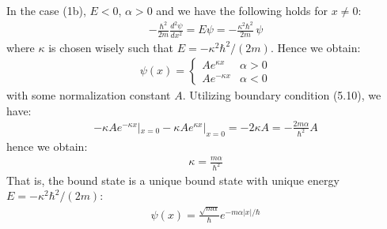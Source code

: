 \documentclass[11pt]{book}
\theoremstyle{break}
\theoremstyle{break}
\begin{document}
In the case (1b), $E<0$, $\alpha>0$ and we have the following holds for $x \neq 0$:
\begin{align*}
- \frac{\hbar^2}{2m}\frac{d^2 \psi}{dx^2} = E\psi = -\frac{\kappa^2 \hbar^2}{2m}\,\psi
\end{align*}
where $\kappa$ is chosen wisely such that $E = -\kappa^2 \hbar^2 / (2m)$. Hence we obtain:
\begin{align*}
\psi(x)  = \begin{cases}
Ae^{\kappa x} & \alpha>0\\
Ae^{-\kappa x} & \alpha<0
\end{cases}
\end{align*}
with some normalization constant $A$. Utilizing boundary condition (5.10), we have:
\begin{align*}
-\kappa A e^{-\kappa x}|_{x=0} - \kappa A e^{\kappa x}|_{x=0} = -2\kappa A = -\frac{2m \alpha }{\hbar^2}A
\end{align*}
hence we obtain:
\begin{align*}
\kappa = \frac{m\alpha}{\hbar^2}
\end{align*}
That is, the bound state is a unique bound state with unique energy $E = -\kappa^2 \hbar^2/(2m)$:
\begin{align*}
\psi(x) = \frac{\sqrt{m\alpha}}{\hbar}e^{-m\alpha |x|/\hbar}
\end{align*} 
\hfill\break
\end{document}
